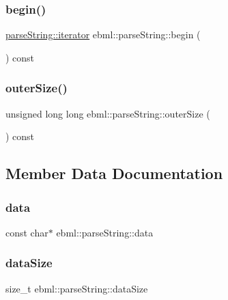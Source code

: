 \subsubsection{\texorpdfstring{begin()}{begin()}}
{\footnotesize\ttfamily \mbox{\hyperlink{classebml_1_1parseString_1_1iterator}{parse\+String\+::iterator}} ebml\+::parse\+String\+::begin (\begin{DoxyParamCaption}{ }\end{DoxyParamCaption}) const}

\mbox{\label{classebml_1_1parseString_afd5aacb39340b2f965a729a0dfd74855}} 
\subsubsection{\texorpdfstring{outer\+Size()}{outerSize()}}
{\footnotesize\ttfamily unsigned long long ebml\+::parse\+String\+::outer\+Size (\begin{DoxyParamCaption}{ }\end{DoxyParamCaption}) const}



\subsection{Member Data Documentation}
\mbox{\label{classebml_1_1parseString_a1e7b6fe6c4ee8b92ab36cc1f89b886c6}} 
\subsubsection{\texorpdfstring{data}{data}}
{\footnotesize\ttfamily const char$\ast$ ebml\+::parse\+String\+::data}

\mbox{\label{classebml_1_1parseString_afcaff2526c0b0e95cffecc90d4c1cd88}} 
\subsubsection{\texorpdfstring{data\+Size}{dataSize}}
{\footnotesize\ttfamily size\+\_\+t ebml\+::parse\+String\+::data\+Size}


